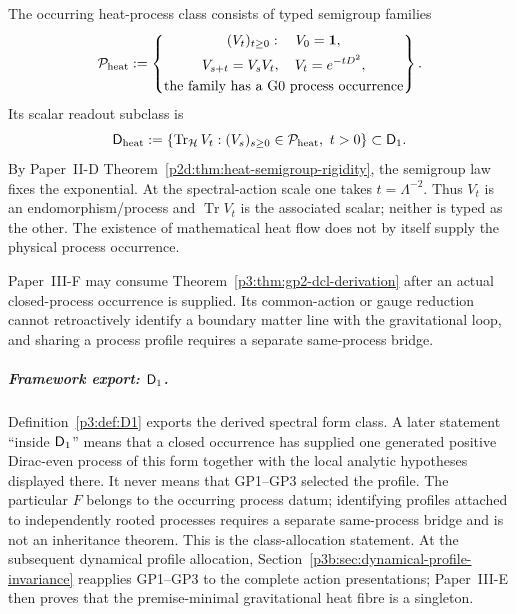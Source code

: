 \documentclass[12pt,a4paper]{article}
\begin{document}
\begin{definition}
\label{p3:def:Dheat}
The occurring heat-process class consists of typed semigroup families
\[
 \mathcal P_{\rm heat}
 :=\left\{\begin{gathered}
 (V_t)_{t\ge0}:\quad V_0=\mathbf1,\\
 V_{s+t}=V_sV_t,\quad V_t=e^{-tD^2},\\
 \text{the family has a G0 process occurrence}
 \end{gathered}\right\}.
\]
Its scalar readout subclass is
\[
 \mathsf D_{\mathrm{heat}}:=\left\{
 \operatorname{Tr}_{\mathcal H}V_t:
 (V_s)_{s\ge0}\in\mathcal P_{\rm heat},\ t>0
 \right\}\subset\mathsf{D}_1.
\]
By Paper~II-D Theorem~\ref{p2d:thm:heat-semigroup-rigidity}, the semigroup
law fixes the exponential.  At the spectral-action scale one takes
\(t=\Lambda^{-2}\).  Thus \(V_t\) is an endomorphism/process and
\(\operatorname{Tr}V_t\) is the associated scalar; neither is typed as the
other.  The existence of mathematical heat flow does not by itself supply
the physical process occurrence.
\end{definition}

\begin{remark}
\label{p3:rem:dcl-reduction-crossref}
Paper~III-F may consume Theorem~\ref{p3:thm:gp2-dcl-derivation} after an
actual closed-process occurrence is supplied.  Its common-action or gauge
reduction cannot retroactively identify a boundary matter line with the
gravitational loop, and sharing a process profile requires a separate
same-process bridge.
\end{remark}

\subparagraph{Framework export: \(\mathsf{D}_1\).}
Definition~\ref{p3:def:D1} exports the derived spectral form class.  A later
statement ``inside \(\mathsf{D}_1\)'' means that a closed occurrence has supplied one
generated positive Dirac-even process of this form together with the local
analytic hypotheses displayed there.  It never means that GP1--GP3 selected
the profile.  The particular \(F\) belongs to the occurring process datum;
identifying profiles attached to independently rooted processes requires a
separate same-process bridge and is not an inheritance theorem.  This is the
class-allocation statement.  At the subsequent dynamical profile allocation,
Section~\ref{p3b:sec:dynamical-profile-invariance} reapplies GP1--GP3 to the
complete action presentations; Paper~III-E then proves that the
premise-minimal gravitational heat fibre is a singleton.
\end{document}
